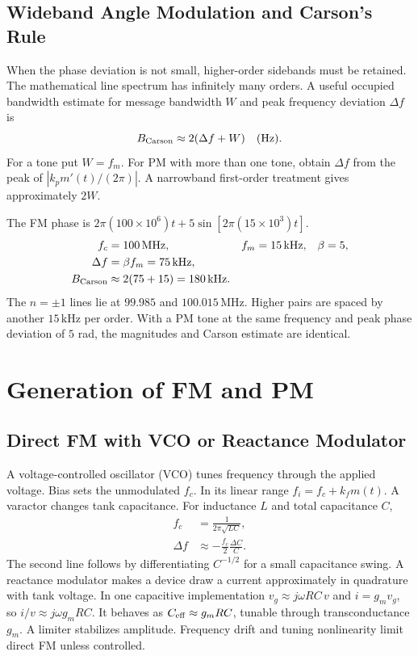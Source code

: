 \documentclass[12pt,a4paper]{article}
\begin{document}
\subsection{Wideband Angle Modulation and Carson's Rule}
When the phase deviation is not small, higher-order sidebands must be retained. The mathematical line spectrum has infinitely many orders. A useful occupied bandwidth estimate for message bandwidth $W$ and peak frequency deviation $\Delta f$ is
\[
 B_{\rm Carson}\approx 2(\Delta f+W)\quad(\mathrm{Hz}).
\]
For a tone put $W=f_m$. For PM with more than one tone, obtain $\Delta f$ from the peak of $|k_pm'(t)/(2\pi)|$. A narrowband first-order treatment gives approximately $2W$.

\begin{tcolorbox}[examplebox, title={Find Index, Line Positions and Bandwidth}]
The FM phase is $2\pi(100\times10^6)t+5\sin[2\pi(15\times10^3)t]$.
\[
\begin{aligned}
 f_c&=100\,\mathrm{MHz},& f_m&=15\,\mathrm{kHz},& \beta&=5,\\
 \Delta f&=\beta f_m=75\,\mathrm{kHz},\\
 B_{\rm Carson}&\approx 2(75+15)=180\,\mathrm{kHz}.
\end{aligned}
\]
The $n=\pm1$ lines lie at $99.985$ and $100.015\,\mathrm{MHz}$. Higher pairs are spaced by another $15\,\mathrm{kHz}$ per order. With a PM tone at the same frequency and peak phase deviation of $5$ rad, the magnitudes and Carson estimate are identical.
\end{tcolorbox}

\section{Generation of FM and PM}
\subsection{Direct FM with VCO or Reactance Modulator}
A voltage-controlled oscillator (VCO) tunes frequency through the applied voltage. Bias sets the unmodulated $f_c$. In its linear range $f_i=f_c+k_fm(t)$. A varactor changes tank capacitance. For inductance $L$ and total capacitance $C$,
\[
\begin{aligned}
 f_c &=\frac{1}{2\pi\sqrt{LC}},\\
 \Delta f&\approx-\frac{f_c}{2}\frac{\Delta C}{C}.
\end{aligned}
\]
The second line follows by differentiating $C^{-1/2}$ for a small capacitance swing. A reactance modulator makes a device draw a current approximately in quadrature with tank voltage. In one capacitive implementation $v_g\approx j\omega RC\,v$ and $i=g_m v_g$, so $i/v\approx j\omega g_mRC$. It behaves as $C_{\rm eff}\approx g_m RC$, tunable through transconductance $g_m$. A limiter stabilizes amplitude. Frequency drift and tuning nonlinearity limit direct FM unless controlled.
\end{document}
